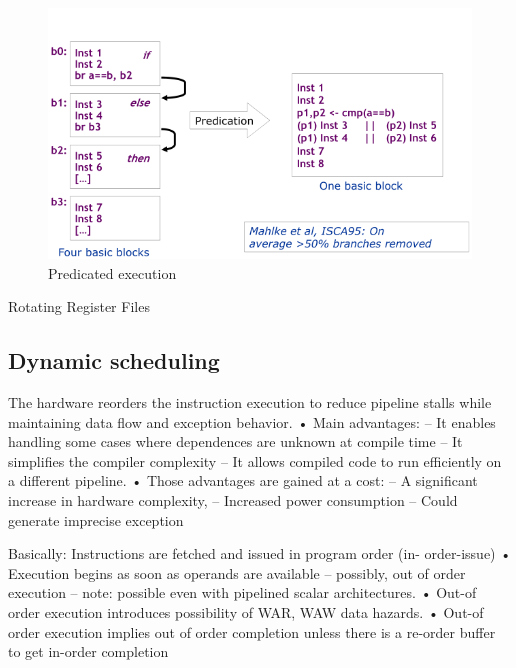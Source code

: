 \begin{figure}[h]
    \centering
    \includegraphics[scale = 0.4]{images/predicated-execution}
    \caption{Predicated execution}
    \label{fig:predicated-execution}
\end{figure}

Rotating Register Files


\clearpage
\subsection{Dynamic scheduling}\label{subsec:dynamic-scheduling}

The hardware reorders the instruction execution to reduce pipeline
stalls while maintaining data flow and exception behavior.
•
Main advantages:
– It enables handling some cases where dependences are
unknown at compile time
– It simplifies the compiler complexity
– It allows compiled code to run efficiently on a different pipeline.
•
Those advantages are gained at a cost:
– A significant increase in hardware complexity,
– Increased power consumption
– Could generate imprecise exception

Basically: Instructions are fetched and issued in program order (in-
order-issue)
•
Execution begins as soon as operands are available
– possibly, out of order execution – note: possible even with
pipelined scalar architectures.
•
Out-of order execution introduces possibility of WAR, WAW data
hazards.
•
Out-of order execution implies out of order completion unless there
is a re-order buffer to get in-order completion

